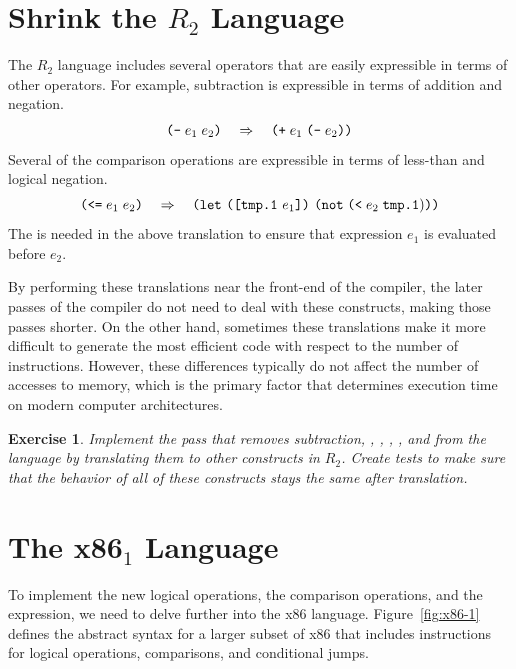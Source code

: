 \documentclass[11pt]{book}
\newtheorem{exercise}[theorem]{Exercise}
\begin{document}
\section{Shrink the $R_2$ Language}
\label{sec:shrink-r2}

The $R_2$ language includes several operators that are easily
expressible in terms of other operators. For example, subtraction is
expressible in terms of addition and negation.
\[
 \texttt{(-}\; e_1 \; e_2\texttt{)} \quad \Rightarrow \quad \texttt{(}\texttt{+} \; e_1 \; \texttt{(}\texttt{-} \; e_2\texttt{)}\texttt{)}
\]
Several of the comparison operations are expressible in terms of
less-than and logical negation.
\[
\texttt{(}\texttt{<=}\; e_1 \; e_2\texttt{)} \quad \Rightarrow \quad
\texttt{(}\texttt{let}~\texttt{(}\texttt{[}\texttt{tmp.1}~e_1\texttt{]}\texttt{)}~\texttt{(}\texttt{not}\;\texttt{(}\texttt{<}\;e_2\;\texttt{tmp.1})\texttt{)}\texttt{)}
\]
The  is needed in the above translation to ensure that
expression $e_1$ is evaluated before $e_2$.

By performing these translations near the front-end of the compiler,
the later passes of the compiler do not need to deal with these
constructs, making those passes shorter. On the other hand, sometimes
these translations make it more difficult to generate the most
efficient code with respect to the number of instructions. However,
these differences typically do not affect the number of accesses to
memory, which is the primary factor that determines execution time on
modern computer architectures.

\begin{exercise}\normalfont
  Implement the pass  that removes subtraction,
  , , \key{<=}, \key{>}, and \key{>=} from the language
  by translating them to other constructs in $R_2$.  Create tests to
  make sure that the behavior of all of these constructs stays the
  same after translation.
\end{exercise}


\section{The x86$_1$ Language}
\label{sec:x86-1}

To implement the new logical operations, the comparison operations,
and the  expression, we need to delve further into the x86
language. Figure~\ref{fig:x86-1} defines the abstract syntax for a
larger subset of x86 that includes instructions for logical
operations, comparisons, and conditional jumps.
\end{document}
